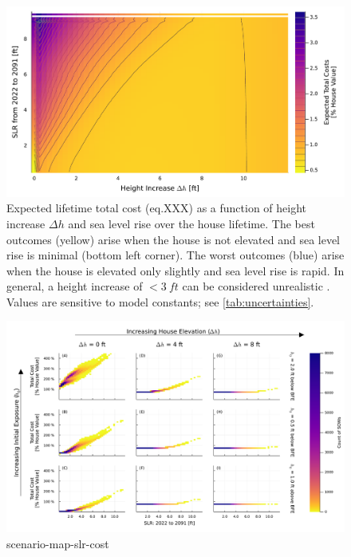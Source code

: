 \documentclass[12pt]{article}
\begin{document}
\begin{figure}
    \centering
    \includegraphics[width=\textwidth]{scenario-map-height-slr}
    \caption{
        Expected lifetime total cost (eq.XXX) as a function of height increase $\Delta h$ and sea level rise over the house lifetime. %
        The best outcomes (yellow) arise when the house is not elevated and sea level rise is minimal (bottom left corner).
        The worst outcomes (blue) arise when the house is elevated only slightly and sea level rise is rapid.
        In general, a height increase of $<\SI{3}{ft}$ can be considered unrealistic \citep{zarekarizi_suboptimal:2020}.
        Values are sensitive to model constants; see \cref{tab:uncertainties}.
    }\label{fig:scenario-map-height-slr}
\end{figure}

\begin{figure}
    \centering
    \includegraphics[width=\textwidth]{scenario-map-slr-cost}
    \caption{scenario-map-slr-cost}\label{fig:scenario-map-slr-cost}
\end{figure}
\end{document}
